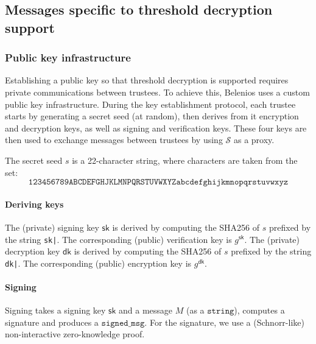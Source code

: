 \documentclass[a4paper]{article}
\newcommand{\jstring}{\texttt{string}}
\begin{document}
\subsection{Messages specific to threshold decryption support}
\label{threshold}

\subsubsection{Public key infrastructure}
\label{pki}

Establishing a public key so that threshold decryption is supported
requires private communications between trustees. To achieve this,
Belenios uses a custom public key infrastructure. During the key
establishment protocol, each trustee starts by generating a secret
seed (at random), then derives from it encryption and decryption keys,
as well as signing and verification keys. These four keys are then
used to exchange messages between trustees by using $\mathcal{S}$ as a proxy.

The secret seed $s$ is a 22-character string, where characters are
taken from the set:
\[\texttt{123456789ABCDEFGHJKLMNPQRSTUVWXYZabcdefghijkmnopqrstuvwxyz}\]

\paragraph{Deriving keys}

The (private) signing key $\textsf{sk}$ is derived by computing the
SHA256 of $s$ prefixed by the string \verb/sk|/. The corresponding
(public) verification key is $g^{\textsf{sk}}$. The (private)
decryption key $\textsf{dk}$ is derived by computing the SHA256 of $s$
prefixed by the string \verb/dk|/. The corresponding (public)
encryption key is $g^{\textsf{dk}}$.

\paragraph{Signing}

Signing takes a signing key $\textsf{sk}$ and a \textsf{message} $M$
(as a $\jstring$), computes a \textsf{signature} and produces a
$\texttt{signed\_msg}$. For the signature, we use a (Schnorr-like)
non-interactive zero-knowledge proof.
\end{document}
